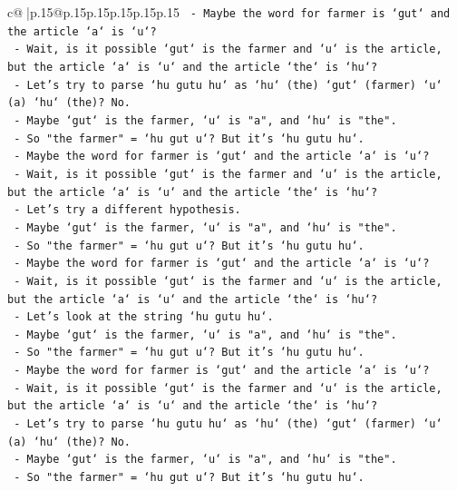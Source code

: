 \documentclass{article}
\begin{document}
{\begin{supertabular}{c@{$\;$}|p{.15\linewidth}@{}p{.15\linewidth}p{.15\linewidth}p{.15\linewidth}p{.15\linewidth}p{.15\linewidth}}
{{{\texttt{   {-} Maybe the word for farmer is `gut` and the article `a` is `u`?} \\
\texttt{   {-} Wait, is it possible `gut` is the farmer and `u` is the article, but the article `a` is `u` and the article `the` is `hu`?} \\
\texttt{   {-} Let's try to parse `hu gutu hu` as `hu` (the) `gut` (farmer) `u` (a) `hu` (the)? No.} \\
\texttt{   {-} Maybe `gut` is the farmer, `u` is "a", and `hu` is "the".} \\
\texttt{   {-} So "the farmer" = `hu gut u`? But it's `hu gutu hu`.} \\
\texttt{   {-} Maybe the word for farmer is `gut` and the article `a` is `u`?} \\
\texttt{   {-} Wait, is it possible `gut` is the farmer and `u` is the article, but the article `a` is `u` and the article `the` is `hu`?} \\
\texttt{   {-} Let's try a different hypothesis.} \\
\texttt{   {-} Maybe `gut` is the farmer, `u` is "a", and `hu` is "the".} \\
\texttt{   {-} So "the farmer" = `hu gut u`? But it's `hu gutu hu`.} \\
\texttt{   {-} Maybe the word for farmer is `gut` and the article `a` is `u`?} \\
\texttt{   {-} Wait, is it possible `gut` is the farmer and `u` is the article, but the article `a` is `u` and the article `the` is `hu`?} \\
\texttt{   {-} Let's look at the string `hu gutu hu`.} \\
\texttt{   {-} Maybe `gut` is the farmer, `u` is "a", and `hu` is "the".} \\
\texttt{   {-} So "the farmer" = `hu gut u`? But it's `hu gutu hu`.} \\
\texttt{   {-} Maybe the word for farmer is `gut` and the article `a` is `u`?} \\
\texttt{   {-} Wait, is it possible `gut` is the farmer and `u` is the article, but the article `a` is `u` and the article `the` is `hu`?} \\
\texttt{   {-} Let's try to parse `hu gutu hu` as `hu` (the) `gut` (farmer) `u` (a) `hu` (the)? No.} \\
\texttt{   {-} Maybe `gut` is the farmer, `u` is "a", and `hu` is "the".} \\
\texttt{   {-} So "the farmer" = `hu gut u`? But it's `hu gutu hu`.} \\
}}}
\end{supertabular}}
\end{document}
